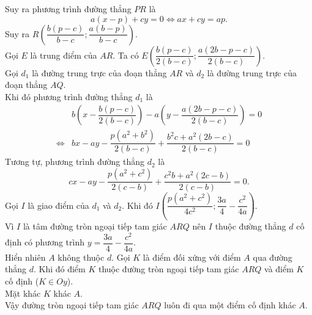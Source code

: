 \begin{bt}
{		Suy ra phương trình đường thẳng $PR$ là
		\[a(x-p)+cy=0\Leftrightarrow ax+cy=ap.\]
		Suy ra $R\left(\dfrac{b(p-c)}{b-c};\dfrac{a(b-p)}{b-c}\right)$.\\
		Gọi $E$ là trung điểm của $AR$. Ta có $E\left(\dfrac{b(p-c)}{2(b-c)};\dfrac{a(2b-p-c)}{2(b-c)}\right)$.\\
		Gọi $d_1$ là đường trung trực của đoạn thẳng $AR$ và $d_2$ là đường trung trực của đoạn thẳng $AQ$.\\
		Khi đó phương trình đường thẳng $d_1$ là
		\begin{align*}
		& b\left(x-\dfrac{b(p-c)}{2(b-c)}\right)-a\left(y-\dfrac{a(2b-p-c)}{2(b-c)}\right)=0\\
		\Leftrightarrow& bx-ay-\dfrac{p(a^2+b^2)}{2(b-c)}+\dfrac{b^2c+a^2(2b-c)}{2(b-c)}=0
		\end{align*}
		Tương tự, phương trình đường thẳng $d_2$ là
		\[cx-ay-\dfrac{p(a^2+c^2)}{2(c-b)}+\dfrac{c^2b+a^2(2c-b)}{2(c-b)}=0.\]
		Gọi $I$ là giao điểm của $d_1$ và $d_2$. Khi đó $I\left(\dfrac{p(a^2+c^2)}{4c^2};\dfrac{3a}{4}-\dfrac{c^2}{4a}\right)$.\\
		Vì $I$ là tâm đường tròn ngoại tiếp tam giác $ARQ$ nên $I$ thuộc đường thẳng $d$ cố định có phương trình $y=\dfrac{3a}{4}-\dfrac{c^2}{4a}$.\\
		Hiển nhiên $A$ không thuộc $d$. Gọi $K$ là điểm đối xứng với điểm $A$ qua đường thẳng $d$. Khi đó điểm $K$ thuộc đường tròn ngoại tiếp tam giác $ARQ$ và điểm $K$ cố định ($K\in Oy$).\\
		Mặt khác $K$ khác $A$.\\
		Vậy đường tròn ngoại tiếp tam giác $ARQ$ luôn đi qua một điểm cố định khác $A$.
	}
\end{bt}
